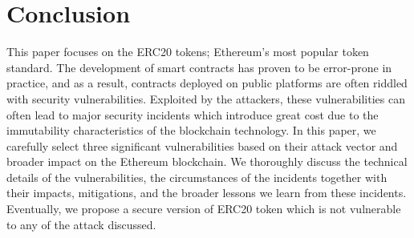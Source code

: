 
\section{Conclusion}

This paper focuses on the ERC20 tokens; Ethereum's most popular token standard. The development of smart contracts has proven to be error-prone in practice, and as a result, contracts deployed on public platforms are often riddled with security vulnerabilities. Exploited by the attackers, these vulnerabilities can often lead to major security incidents which introduce great cost due to the immutability characteristics of the blockchain technology. In this paper, we carefully select three significant vulnerabilities based on their attack vector and broader impact on the Ethereum blockchain. We thoroughly discuss the technical details of the vulnerabilities, the circumstances of the incidents together with their impacts, mitigations, and the broader lessons we learn from these incidents. Eventually, we propose a secure version of ERC20 token which is not vulnerable to any of the attack discussed.



